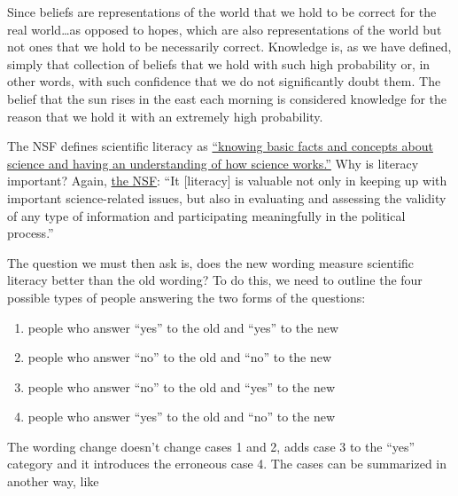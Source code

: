 Since beliefs are representations of the world that we hold to be correct for the real world\ldots{}as
opposed to hopes, which are also representations of the world but not
ones that we hold to be necessarily correct. Knowledge is, as we have defined, simply that collection
of beliefs that we hold with such high probability or, in other words,
with such confidence that we do not significantly doubt them. The belief
that the sun rises in the east each morning is considered knowledge for
the reason that we hold it with an extremely high probability. 

The NSF defines scientific literacy as
\href{http://www.nsf.gov/statistics/seind04/c7/c7s2.htm}{``knowing basic
facts and concepts about science and having an understanding of how
science works.''} Why is literacy important? Again,
\href{http://www.nsf.gov/statistics/seind04/c7/c7s2.htm}{the NSF}: ``It [literacy] is valuable not only in keeping up with important science-related issues, but also in evaluating and assessing the validity of any type of information and participating meaningfully in the political process.''

The question we must then ask is, does the new wording measure scientific literacy better than the old wording? To do this, we need to outline the four possible types of people answering the two forms of the questions:

\begin{enumerate}
\def\labelenumi{\arabic{enumi}.}
\itemsep1pt\parskip0pt
\item
  people who answer ``yes'' to the old and ``yes'' to the new
\item
  people who answer ``no'' to the old and ``no'' to the new
\item
  people who answer ``no'' to the old and ``yes'' to the new
\item
  people who answer ``yes'' to the old and ``no'' to the new
\end{enumerate}

The wording change doesn't change cases 1 and 2, adds case 3 to the
``yes'' category and it introduces the erroneous case 4. The cases can
be summarized in another way, like

